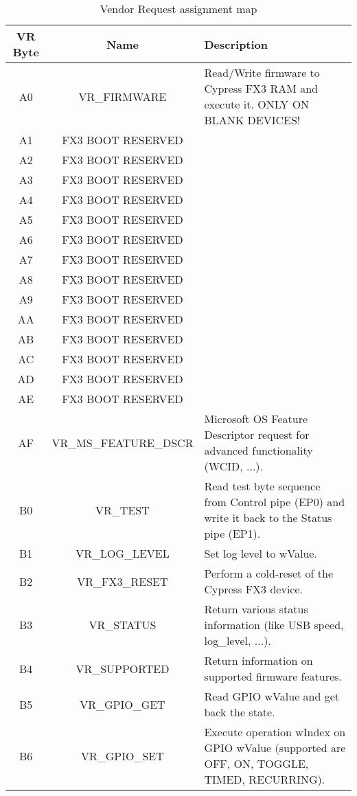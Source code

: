 \begin{center}
\begin{longtabu} to \linewidth {|c|c|X|}
\caption{Vendor Request assignment map} \label{tab:vr_assignment}
\\
\hline
VR Byte & Name & Description \\ \hline
A0 & VR\_FIRMWARE & Read/Write firmware to Cypress FX3 RAM and execute it. ONLY ON BLANK DEVICES! \\ \hline
A1 & FX3 BOOT RESERVED &  \\ \hline
A2 & FX3 BOOT RESERVED &  \\ \hline
A3 & FX3 BOOT RESERVED &  \\ \hline
A4 & FX3 BOOT RESERVED &  \\ \hline
A5 & FX3 BOOT RESERVED &  \\ \hline
A6 & FX3 BOOT RESERVED &  \\ \hline
A7 & FX3 BOOT RESERVED &  \\ \hline
A8 & FX3 BOOT RESERVED &  \\ \hline
A9 & FX3 BOOT RESERVED &  \\ \hline
AA & FX3 BOOT RESERVED &  \\ \hline
AB & FX3 BOOT RESERVED &  \\ \hline
AC & FX3 BOOT RESERVED &  \\ \hline
AD & FX3 BOOT RESERVED &  \\ \hline
AE & FX3 BOOT RESERVED &  \\ \hline
AF & VR\_MS\_FEATURE\_DSCR & Microsoft OS Feature Descriptor request for advanced functionality (WCID, ...). \\ \hline
B0 & VR\_TEST & Read test byte sequence from Control pipe (EP0) and write it back to the Status pipe (EP1). \\ \hline
B1 & VR\_LOG\_LEVEL & Set log level to wValue. \\ \hline
B2 & VR\_FX3\_RESET & Perform a cold-reset of the Cypress FX3 device. \\ \hline
B3 & VR\_STATUS & Return various status information (like USB speed, log\_level, ...). \\ \hline
B4 & VR\_SUPPORTED & Return information on supported firmware features. \\ \hline
B5 & VR\_GPIO\_GET & Read GPIO wValue and get back the state. \\ \hline
B6 & VR\_GPIO\_SET & Execute operation wIndex on GPIO wValue (supported are OFF, ON, TOGGLE, TIMED, RECURRING). \\ \hline

\end{longtabu}
\end{center}

